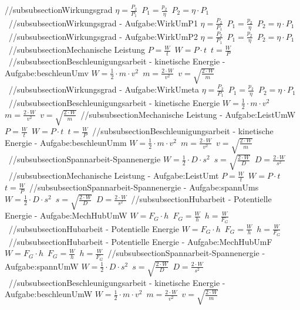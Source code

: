 //subsubsection{Wirkungsgrad} 
$ \eta  = \frac{P_{2} }{P_{1} } $\ 
$ P_{1}  = \frac{p_{2} }{\eta } $\ 
$ P_{2}  = \eta \cdot P_{1} $\ 
//subsubsection{Wirkungsgrad - Aufgabe:WirkUmP1} 
$ \eta  = \frac{P_{2} }{P_{1} } $\ 
$ P_{1}  = \frac{p_{2} }{\eta } $\ 
$ P_{2}  = \eta \cdot P_{1} $\ 
//subsubsection{Wirkungsgrad - Aufgabe:WirkUmP2} 
$ \eta  = \frac{P_{2} }{P_{1} } $\ 
$ P_{1}  = \frac{p_{2} }{\eta } $\ 
$ P_{2}  = \eta \cdot P_{1} $\ 
//subsubsection{Mechanische Leistung} 
$ P = \frac{W}{t} $\ 
$ W = P\cdot t $\ 
$ t = \frac{W}{P} $\ 
//subsubsection{Beschleunigungsarbeit - kinetische Energie - Aufgabe:beschleunUmv} 
$ W = \frac{1}{2}\cdot m\cdot v^{2} $\ 
$ m = \frac{2\cdot W}{ v^{2} } $\ 
$ v = \sqrt{\frac{2\cdot W}{ m}} $\ 
//subsubsection{Wirkungsgrad - Aufgabe:WirkUmeta} 
$ \eta  = \frac{P_{2} }{P_{1} } $\ 
$ P_{1}  = \frac{p_{2} }{\eta } $\ 
$ P_{2}  = \eta \cdot P_{1} $\ 
//subsubsection{Beschleunigungsarbeit - kinetische Energie} 
$ W = \frac{1}{2}\cdot m\cdot v^{2} $\ 
$ m = \frac{2\cdot W}{ v^{2} } $\ 
$ v = \sqrt{\frac{2\cdot W}{ m}} $\ 
//subsubsection{Mechanische Leistung - Aufgabe:LeistUmW} 
$ P = \frac{W}{t} $\ 
$ W = P\cdot t $\ 
$ t = \frac{W}{P} $\ 
//subsubsection{Beschleunigungsarbeit - kinetische Energie - Aufgabe:beschleunUmm} 
$ W = \frac{1}{2}\cdot m\cdot v^{2} $\ 
$ m = \frac{2\cdot W}{ v^{2} } $\ 
$ v = \sqrt{\frac{2\cdot W}{ m}} $\ 
//subsubsection{Spannarbeit-Spannenergie} 
$ W =\frac{1}{2}\cdot D\cdot s^{2} $\ 
$ s = \sqrt{\frac{2\cdot W}{ D}} $\ 
$ D =\frac{2\cdot W}{s^{2} } $\ 
//subsubsection{Mechanische Leistung - Aufgabe:LeistUmt} 
$ P = \frac{W}{t} $\ 
$ W = P\cdot t $\ 
$ t = \frac{W}{P} $\ 
//subsubsection{Spannarbeit-Spannenergie - Aufgabe:spannUms} 
$ W =\frac{1}{2}\cdot D\cdot s^{2} $\ 
$ s = \sqrt{\frac{2\cdot W}{ D}} $\ 
$ D =\frac{2\cdot W}{s^{2} } $\ 
//subsubsection{Hubarbeit - Potentielle Energie - Aufgabe:MechHubUmW} 
$ W = F_{G} \cdot h $\ 
$ F_{G}  = \frac{W}{h} $\ 
$ h = \frac{W}{F_{G} } $\ 
//subsubsection{Hubarbeit - Potentielle Energie} 
$ W = F_{G} \cdot h $\ 
$ F_{G}  = \frac{W}{h} $\ 
$ h = \frac{W}{F_{G} } $\ 
//subsubsection{Hubarbeit - Potentielle Energie - Aufgabe:MechHubUmF} 
$ W = F_{G} \cdot h $\ 
$ F_{G}  = \frac{W}{h} $\ 
$ h = \frac{W}{F_{G} } $\ 
//subsubsection{Spannarbeit-Spannenergie - Aufgabe:spannUmW} 
$ W =\frac{1}{2}\cdot D\cdot s^{2} $\ 
$ s = \sqrt{\frac{2\cdot W}{ D}} $\ 
$ D =\frac{2\cdot W}{s^{2} } $\ 
//subsubsection{Beschleunigungsarbeit - kinetische Energie - Aufgabe:beschleunUmW} 
$ W = \frac{1}{2}\cdot m\cdot v^{2} $\ 
$ m = \frac{2\cdot W}{ v^{2} } $\ 
$ v = \sqrt{\frac{2\cdot W}{ m}} $\ 
